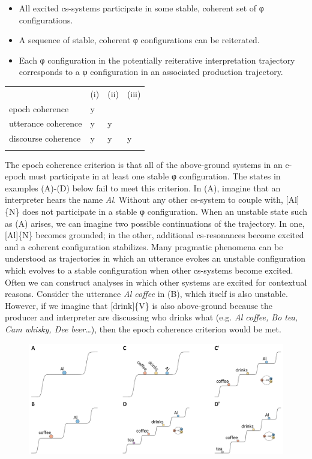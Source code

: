 \begin{itemize}
\item 
All excited cs-systems participate in some stable, coherent set of φ configurations.
\item 
A sequence of stable, coherent φ configurations can be reiterated.
\item 
Each φ configuration in the potentially reiterative interpretation trajectory corresponds to a φ configuration in an associated production trajectory.
\end{itemize}

\begin{tabularx}{\textwidth}{XXXX} & (i) & (ii) & (iii)\\
\lsptoprule
\raggedleft epoch coherence & y &  & \\
\raggedleft utterance coherence & y & y & \\
\raggedleft discourse coherence & y & y & y\\
\lspbottomrule
\end{tabularx}
  The epoch coherence criterion is that all of the above-ground systems in an e-epoch must participate in at least one stable φ configuration. The states in examples (A)-(D) below fail to meet this criterion. In (A), imagine that an interpreter hears the name \textit{Al}. Without any other cs-system to couple with, [Al]\{N\} does not participate in a stable φ configuration. When an unstable state such as (A) arises, we can imagine two possible continuations of the trajectory. In one, [Al]\{N\} becomes grounded; in the other, additional cs-resonances become excited and a coherent configuration stabilizes. Many pragmatic phenomena can be understood as trajectories in which an utterance evokes an unstable configuration which evolves to a stable configuration when other cs-systems become excited. Often we can construct analyses in which other systems are excited for contextual reasons. Consider the utterance \textit{Al coffee} in (B), which itself is also unstable. However, if we imagine that [drink]\{V\} is also above-ground because the producer and interpreter are discussing who drinks what (e.g. \textit{Al coffee, Bo tea, Cam whisky, Dee beer…}), then the epoch coherence criterion would be met.

  
\begin{figure}
\includegraphics[width=\textwidth]{figures/Tilsen-img124.png}
\caption{\missingcaption}
\label{fig:}
\end{figure}
 

